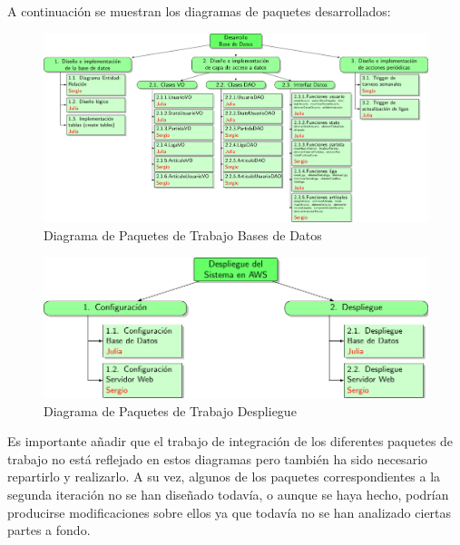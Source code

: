 A continuación se muestran los diagramas de paquetes desarrollados:

\begin{figure}[H]
		\hspace{-2cm}
		\includegraphics[scale=0.8]{figuras/edtBasesDatos.pdf}
		\caption{Diagrama de Paquetes de Trabajo Bases de Datos}
	\end{figure}

\begin{figure}[H]
		\centering
		\includegraphics[scale=0.8]{figuras/edtDespliegue.pdf}
		\caption{Diagrama de Paquetes de Trabajo Despliegue}
	\end{figure}

Es importante añadir que el trabajo de integración de los diferentes paquetes de trabajo no está reflejado en estos diagramas pero también ha sido necesario repartirlo y realizarlo. A su vez, algunos de los paquetes correspondientes a la segunda iteración no se han diseñado todavía, o aunque se haya hecho, podrían producirse modificaciones sobre ellos ya que todavía no se han analizado ciertas partes a fondo.
